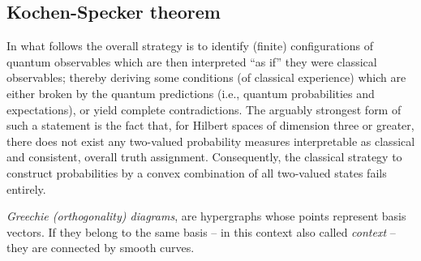 \subsection{Kochen-Specker theorem}
\label{2011-m-KST}

In what follows the overall strategy is to identify (finite) configurations of quantum observables which are then
interpreted ``as if'' they were classical observables; thereby deriving some conditions (of classical experience) which are either broken
by the quantum predictions (i.e., quantum probabilities and expectations), or yield complete contradictions.
The arguably strongest form of such a statement is the fact that, for   Hilbert spaces of dimension three or greater,
there does not exist any
two-valued probability measures interpretable as classical and consistent, overall truth assignment.\cite[-15mm]{specker-60,kochen1}
Consequently, the classical strategy
to construct probabilities by a convex combination of all two-valued states fails entirely.

{\em Greechie (orthogonality) diagrams},\cite{greechie:71} are hypergraphs whose
points  represent basis vectors.
If they belong to the same basis -- in this context also called {\em context} -- they are connected by  smooth curves.




